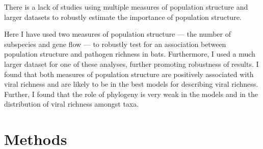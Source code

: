 
There is a lack of studies using multiple measures of population structure and larger datasets to robustly estimate the importance of population structure.



Here I have used two measures of population structure --- the number of subspecies and gene flow --- to robustly test for an association between population structure and pathogen richness in bats.
Furthermore, I used a much larger dataset for one of these analyses, further promoting robustness of results.
I found that both measures of population structure are positively associated with viral richness and are likely to be in the best models for describing viral richness.
Further, I found that the role of phylogeny is very weak in the models and in the distribution of viral richness amongst taxa.



\section{Methods}






























































